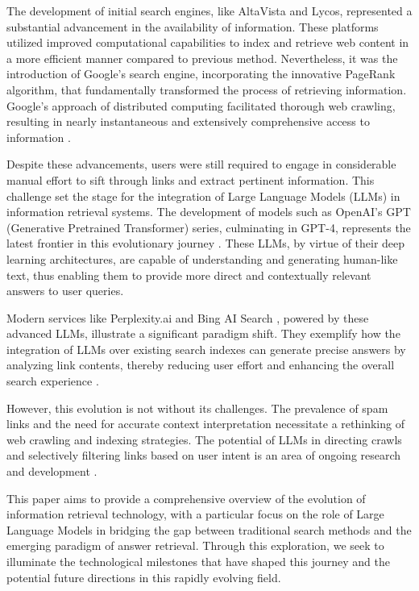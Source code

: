 \documentclass{article}
\begin{document}
The development of initial search engines, like AltaVista and Lycos, represented a substantial advancement in the availability of information. These platforms utilized improved computational capabilities to index and retrieve web content in a more efficient manner compared to previous method. Nevertheless, it was the introduction of Google's search engine, incorporating the innovative PageRank algorithm, that fundamentally transformed the process of retrieving information. Google's approach of distributed computing facilitated thorough web crawling, resulting in nearly instantaneous and extensively comprehensive access to information \citep{brin1998anatomy}.

Despite these advancements, users were still required to engage in considerable manual effort to sift through links and extract pertinent information. This challenge set the stage for the integration of Large Language Models (LLMs) in information retrieval systems. The development of models such as OpenAI's GPT (Generative Pretrained Transformer) series, culminating in GPT-4, represents the latest frontier in this evolutionary journey \citep{brown2020language}. These LLMs, by virtue of their deep learning architectures, are capable of understanding and generating human-like text, thus enabling them to provide more direct and contextually relevant answers to user queries.

Modern services like Perplexity.ai \citep{PerplexityAI2023} and Bing AI Search \citep{BingAI2023}, powered by these advanced LLMs, illustrate a significant paradigm shift. They exemplify how the integration of LLMs over existing search indexes can generate precise answers by analyzing link contents, thereby reducing user effort and enhancing the overall search experience \citep{fostikov2023first}.

However, this evolution is not without its challenges. The prevalence of spam links and the need for accurate context interpretation necessitate a rethinking of web crawling and indexing strategies. The potential of LLMs in directing crawls and selectively filtering links based on user intent is an area of ongoing research and development \citep{bethany2024large}.

This paper aims to provide a comprehensive overview of the evolution of information retrieval technology, with a particular focus on the role of Large Language Models in bridging the gap between traditional search methods and the emerging paradigm of answer retrieval. Through this exploration, we seek to illuminate the technological milestones that have shaped this journey and the potential future directions in this rapidly evolving field.
\end{document}
